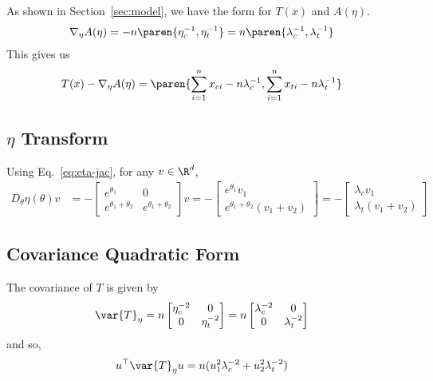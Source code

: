 \documentclass[10pt, a4paper]{article}
\begin{document}
As shown in Section~\ref{sec:model},
we have the form for $T(x)$ and $A(\eta)$.
\begin{align*}
    \nabla_\eta A(\eta)
    &=
    -n \paren{\eta_c^{-1}, \eta_t^{-1}}
    =
    n \paren{\lambda_c^{-1}, \lambda_t^{-1}}
\end{align*}
This gives us
\begin{align*}
    T(x) - \nabla_\eta A(\eta)
    &=
    \paren{%
        \sum\limits_{i=1}^n x_{ci} - n\lambda_c^{-1},
        \sum\limits_{i=1}^n x_{ti} - n\lambda_t^{-1}
    }
\end{align*}

\subsection{$\eta$ Transform}

Using Eq.~\ref{eq:eta-jac},
for any $v \in \R^d$,
\begin{align*}
    D_\theta \eta(\theta) v 
    &=
    -
    \begin{bmatrix}
        e^{\theta_1} & 0 \\
        e^{\theta_1+\theta_2} & e^{\theta_1+\theta_2} 
    \end{bmatrix}
    v
    =
    -
    \begin{bmatrix}
        e^{\theta_1} v_1 \\
        e^{\theta_1+\theta_2} (v_1+v_2)
    \end{bmatrix}
    =
    -
    \begin{bmatrix}
        \lambda_c v_1 \\
        \lambda_t (v_1+v_2)
    \end{bmatrix}
\end{align*}

\subsection{Covariance Quadratic Form}

The covariance of $T$ is given by 
\begin{align}
    \var{T}_\eta &= 
    n
    \begin{bmatrix}
        \eta_c^{-2} & 0 \\
        0 & \eta_t^{-2}
    \end{bmatrix}
    =
    n
    \begin{bmatrix}
        \lambda_c^{-2} & 0 \\
        0 & \lambda_t^{-2}
    \end{bmatrix}
    \label{eq:t-cov}
\end{align}
and so,
\begin{align*}
    u^\top \var{T}_\eta u &=
    n (u_1^2 \lambda_c^{-2} + u_2^2 \lambda_t^{-2})
\end{align*}
\end{document}

